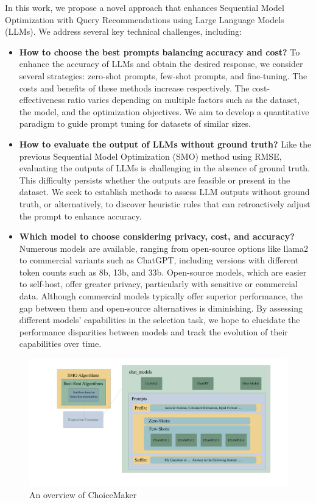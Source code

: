 \documentclass{ieeeaccess}
\begin{document}
In this work, we propose a novel approach that enhances Sequential Model Optimization with Query Recommendations using Large Language Models (LLMs). We address several key technical challenges, including:
\begin{itemize}
  
 

        \item \textbf{How to choose the best prompts balancing accuracy and cost?}
        To enhance the accuracy of LLMs and obtain the desired response, we consider several strategies: zero-shot prompts, few-shot prompts, and fine-tuning. The costs and benefits of these methods increase respectively. The cost-effectiveness ratio varies depending on multiple factors such as the dataset, the model, and the optimization objectives. We aim to develop a quantitative paradigm to guide prompt tuning for datasets of similar sizes.
        
        \item \textbf{How to evaluate the output of LLMs without ground truth?}
        Like the previous Sequential Model Optimization (SMO) method using RMSE, evaluating the outputs of LLMs is challenging in the absence of ground truth. This difficulty persists whether the outputs are feasible or present in the dataset. We seek to establish methods to assess LLM outputs without ground truth, or alternatively, to discover heuristic rules that can retroactively adjust the prompt to enhance accuracy.
        
        \item \textbf{Which model to choose considering privacy, cost, and accuracy?}
        Numerous models are available, ranging from open-source options like llama2 to commercial variants such as ChatGPT, including versions with different token counts such as 8b, 13b, and 33b. Open-source models, which are easier to self-host, offer greater privacy, particularly with sensitive or commercial data. Although commercial models typically offer superior performance, the gap between them and open-source alternatives is diminishing. By assessing different models’ capabilities in the selection task, we hope to elucidate the performance disparities between models and track the evolution of their capabilities over time.
 
\end{itemize}

\begin{figure}[ht]
    \centering
    \includegraphics[page=1,width=\textwidth]{intro.pdf}
    \caption{An overview of ChoiceMaker} \label{fig.1}
  \end{figure}
\end{document}
